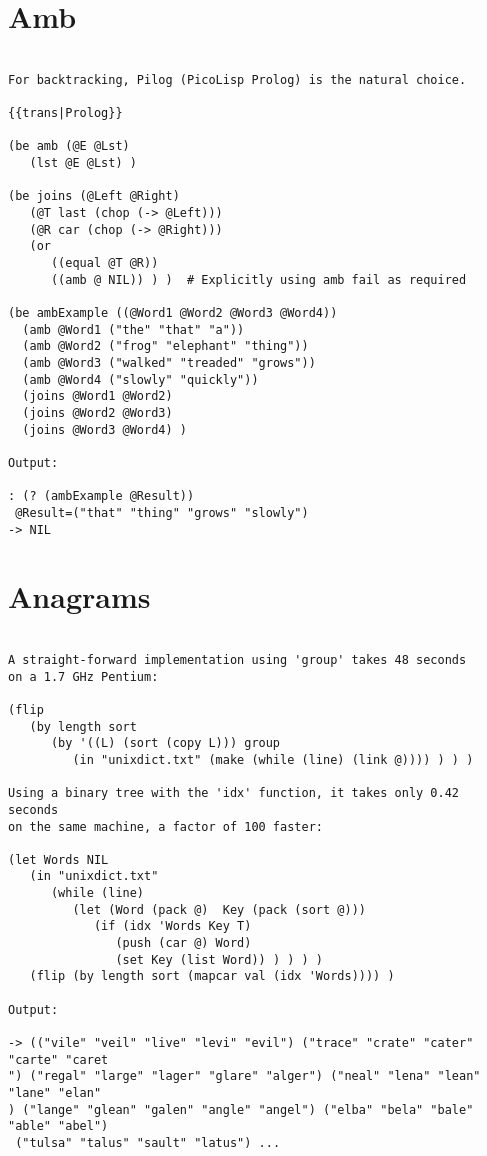 \section*{Amb}

\begin{verbatim}

For backtracking, Pilog (PicoLisp Prolog) is the natural choice.

{{trans|Prolog}}

(be amb (@E @Lst)
   (lst @E @Lst) )

(be joins (@Left @Right)
   (@T last (chop (-> @Left)))
   (@R car (chop (-> @Right)))
   (or
      ((equal @T @R))
      ((amb @ NIL)) ) )  # Explicitly using amb fail as required

(be ambExample ((@Word1 @Word2 @Word3 @Word4))
  (amb @Word1 ("the" "that" "a"))
  (amb @Word2 ("frog" "elephant" "thing"))
  (amb @Word3 ("walked" "treaded" "grows"))
  (amb @Word4 ("slowly" "quickly"))
  (joins @Word1 @Word2)
  (joins @Word2 @Word3)
  (joins @Word3 @Word4) )

Output:

: (? (ambExample @Result))
 @Result=("that" "thing" "grows" "slowly")
-> NIL

\end{verbatim}

\section*{Anagrams}

\begin{verbatim}

A straight-forward implementation using 'group' takes 48 seconds
on a 1.7 GHz Pentium:

(flip
   (by length sort
      (by '((L) (sort (copy L))) group
         (in "unixdict.txt" (make (while (line) (link @)))) ) ) )

Using a binary tree with the 'idx' function, it takes only 0.42 seconds
on the same machine, a factor of 100 faster:

(let Words NIL
   (in "unixdict.txt"
      (while (line)
         (let (Word (pack @)  Key (pack (sort @)))
            (if (idx 'Words Key T)
               (push (car @) Word)
               (set Key (list Word)) ) ) ) )
   (flip (by length sort (mapcar val (idx 'Words)))) )

Output:

-> (("vile" "veil" "live" "levi" "evil") ("trace" "crate" "cater" "carte" "caret
") ("regal" "large" "lager" "glare" "alger") ("neal" "lena" "lean" "lane" "elan"
) ("lange" "glean" "galen" "angle" "angel") ("elba" "bela" "bale" "able" "abel")
 ("tulsa" "talus" "sault" "latus") ...

\end{verbatim}

